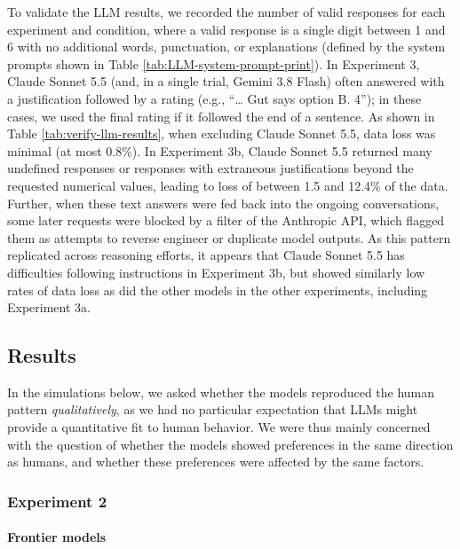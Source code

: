\documentclass[
]{article}
\begin{document}
To validate the LLM results, we recorded the number of valid responses for each experiment and condition, where a valid response is a single digit between 1 and 6 with no additional words, punctuation, or explanations (defined by the system prompts shown in Table \ref{tab:LLM-system-prompt-print}). In Experiment 3, Claude Sonnet 5.5 (and, in a single trial, Gemini 3.8 Flash) often answered with a justification followed by a rating (e.g., ``\ldots{} Gut says option B. 4''); in these cases, we used the final rating if it followed the end of a sentence. As shown in Table \ref{tab:verify-llm-results}, when excluding Claude Sonnet 5.5, data loss was minimal (at most 0.8\%). In Experiment 3b, Claude Sonnet 5.5 returned many undefined responses or responses with extraneous justifications beyond the requested numerical values, leading to loss of between 1.5 and 12.4\% of the data. Further, when these text answers were fed back into the ongoing conversations, some later requests were blocked by a filter of the Anthropic API, which flagged them as attempts to reverse engineer or duplicate model outputs. As this pattern replicated across reasoning efforts, it appears that Claude Sonnet 5.5 has difficulties following instructions in Experiment 3b, but showed similarly low rates of data loss as did the other models in the other experiments, including Experiment 3a.

\clearpage

\subsection{Results}\label{results}

In the simulations below, we asked whether the models reproduced the human pattern \emph{qualitatively}, as we had no particular expectation that LLMs might provide a quantitative fit to human behavior. We were thus mainly concerned with the question of whether the models showed preferences in the same direction as humans, and whether these preferences were affected by the same factors.

\subsubsection{Experiment 2}\label{experiment-2}

\paragraph{Frontier models}\label{frontier-models}
\end{document}
